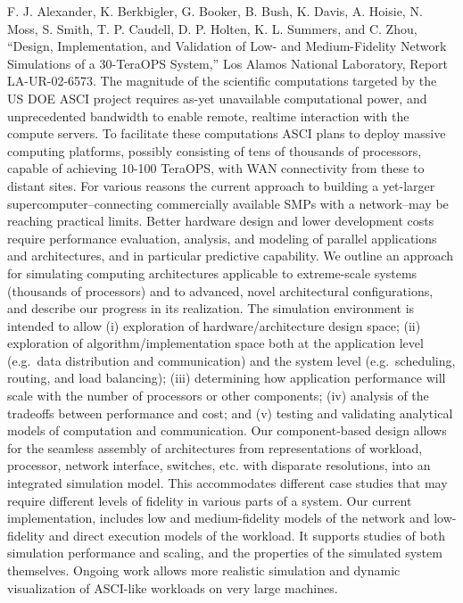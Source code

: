 \documentclass[]{article}
\begin{document}
F. J. Alexander, K. Berkbigler, G. Booker, B. Bush, K. Davis, A. Hoisie,
N. Moss, S. Smith, T. P. Caudell, D. P. Holten, K. L. Summers, and C.
Zhou, ``Design, Implementation, and Validation of Low- and
Medium-Fidelity Network Simulations of a 30-TeraOPS System,'' Los Alamos
National Laboratory, Report LA-UR-02-6573. The magnitude of the
scientific computations targeted by the US DOE ASCI project requires
as-yet unavailable computational power, and unprecedented bandwidth to
enable remote, realtime interaction with the compute servers. To
facilitate these computations ASCI plans to deploy massive computing
platforms, possibly consisting of tens of thousands of processors,
capable of achieving 10-100 TeraOPS, with WAN connectivity from these to
distant sites. For various reasons the current approach to building a
yet-larger supercomputer--connecting commercially available SMPs with a
network--may be reaching practical limits. Better hardware design and
lower development costs require performance evaluation, analysis, and
modeling of parallel applications and architectures, and in particular
predictive capability. We outline an approach for simulating computing
architectures applicable to extreme-scale systems (thousands of
processors) and to advanced, novel architectural configurations, and
describe our progress in its realization. The simulation environment is
intended to allow (i) exploration of hardware/architecture design space;
(ii) exploration of algorithm/implementation space both at the
application level (e.g.~data distribution and communication) and the
system level (e.g.~scheduling, routing, and load balancing); (iii)
determining how application performance will scale with the number of
processors or other components; (iv) analysis of the tradeoffs between
performance and cost; and (v) testing and validating analytical models
of computation and communication. Our component-based design allows for
the seamless assembly of architectures from representations of workload,
processor, network interface, switches, etc. with disparate resolutions,
into an integrated simulation model. This accommodates different case
studies that may require different levels of fidelity in various parts
of a system. Our current implementation, includes low and
medium-fidelity models of the network and low-fidelity and direct
execution models of the workload. It supports studies of both simulation
performance and scaling, and the properties of the simulated system
themselves. Ongoing work allows more realistic simulation and dynamic
visualization of ASCI-like workloads on very large machines.
\end{document}
